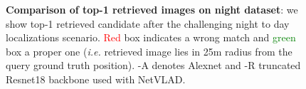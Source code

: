 \begin{figure}
	\caption[Comparison of top-1 retrieved images on night dataset]{\label{fig:night_im_exs} \textbf{Comparison of top-1 retrieved images on night dataset}: we show top-1 retrieved candidate after the challenging night to day localizations scenario. \textcolor{red}{Red} box indicates a wrong match and \textcolor{green}{green} box a proper one (\textit{i.e.} retrieved image lies in 25m radius from the query ground truth position). -A denotes Alexnet and -R truncated Resnet18 backbone used with NetVLAD.}
\end{figure}
